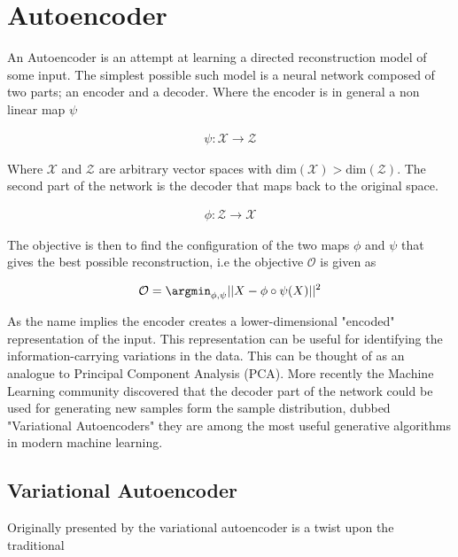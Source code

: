 \section{Autoencoder}
An Autoencoder is an attempt at learning a directed reconstruction model of some input.
The simplest possible such model is a neural network composed of two parts; an encoder and a decoder.
Where the encoder is in general a non linear map $\psi$

\begin{align*}
  \psi: \mathcal{X} \rightarrow \mathcal{Z}
\end{align*}

\noindent Where $\mathcal{X} $ and $\mathcal{Z}$ are arbitrary vector spaces with $\text{dim}(\mathcal{X}) > \text{dim}(\mathcal{Z})$.
The second part of the network is the decoder that maps back to the original space.


\begin{align*}
  \phi: \mathcal{Z} \rightarrow \mathcal{X}
\end{align*}

\noindent The objective is then to find the configuration of the two maps $\phi$ and $\psi$
that gives the best possible reconstruction, i.e the objective $\mathcal{O}$ is given as

\begin{align}\label{eq:objective_autoenc}
  \mathcal{O} = \argmin_{\phi, \psi} || X - \phi \circ \psi(X)||^2
\end{align}

\noindent As the name implies the encoder creates a lower-dimensional "encoded" representation of the input.
This representation can be useful for identifying the information-carrying variations
in the data. This can be thought of as an analogue to Principal Component Analysis (PCA)\cite{Marsland2009}.
More recently the Machine Learning community discovered that the decoder part of the network could be used for generating
new samples form the sample distribution, dubbed "Variational Autoencoders" they are among the most useful generative algorithms in modern machine learning.

\subsection{Variational Autoencoder}

Originally presented by \citet{Kingma2013} the variational autoencoder is a twist upon the traditional
